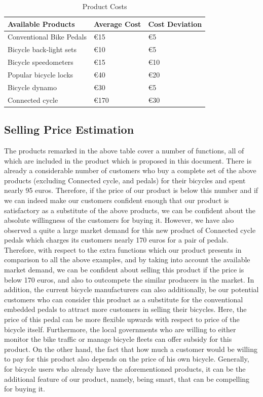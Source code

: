 \documentclass{article}
\begin{document}
	\begin{table}[h]
		\begin{center}
			\begin{tabular}{|C{6cm}|C{3cm}|C{4cm}|}
				\hline
				Available Products & Average Cost & Cost Deviation  \\
				\hline
				Conventional Bike Pedals & \euro 15 & \euro 5\\
				\hline
				Bicycle back-light sets & \euro 10 & \euro 5\\
				\hline
				Bicycle speedometers & \euro 15 & \euro 10\\
				\hline
				Popular bicycle locks & \euro 40 & \euro 20 \\ 
				\hline
				Bicycle dynamo & \euro 30 & \euro 5 \\
				\hline
				Connected cycle & \euro 170 & \euro 30 \\
				\hline
				
				
			\end{tabular}
			\caption{Product Costs}
		\end{center}
	\end{table}
	
	
	\subsection{Selling Price Estimation}
	The products remarked in the above table cover a number of functions, all of which are included in the product which is proposed in this document. There is already a considerable number of customers who buy a complete set of the above products (excluding Connected cycle, and pedals) for their bicycles and spent nearly 95 euros. Therefore, if the price of our product is below this number and if we can indeed make our customers confident enough that our product is satisfactory as a substitute of the above products, we can be confident about the absolute willingness of the customers for buying it. However, we have also observed a quite a large market demand for this new product of Connected cycle pedals which charges its customers nearly 170 euros for a pair of pedals. Therefore, with respect to the extra functions which our product presents in comparison to all the above examples, and by taking into account the available market demand, we can be confident about selling this product if the price is below 170 euros, and also to outcompete the similar producers in the market. In addition, the current bicycle manufacturers can also additionally, be our potential customers who can consider this product as a substitute for the conventional embedded pedals to attract more customers in selling their bicycles. Here, the price of this pedal can be more flexible upwards with respect to price of the bicycle itself. Furthermore, the local governments who are willing to either monitor the bike traffic or manage bicycle fleets can offer subsidy for this product. On the other hand, the fact that how much a customer would be willing to pay for this product also depends on the price of his own bicycle. Generally, for bicycle users who already have the aforementioned products, it can be the additional feature of our product, namely, being smart, that can be compelling for buying it.  
	
\end{document}
